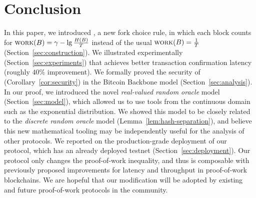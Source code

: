 \section{Conclusion}

In this paper, we introduced \poem, a new fork choice rule, in which each block
counts for $\textsc{work}(B) = \gamma - \lg \frac{H(B)}{T}$ instead of the usual $\textsc{work}(B) = \frac{1}{T}$
(Section~\ref{sec:construction}).
We illustrated experimentally (Section~\ref{sec:experiments}) that \poem achieves better transaction confirmation latency
(roughly $40\%$ improvement). We formally proved the security of \poem (Corollary~\ref{cor:security})
in the Bitcoin Backbone model
(Section~\ref{sec:analysis}).
In our proof, we introduced the novel \emph{real-valued random oracle} model (Section~\ref{sec:model}), which allowed us
to use tools from the continuous domain such as the exponential distribution. We showed this
model to be closely related to the \emph{discrete random oracle} model (Lemma~\ref{lem:hash-separation}),
and believe this new mathematical tooling may be independently useful for the analysis of other protocols.
We reported on the production-grade deployment of our protocol, which has an already deployed testnet
(Section~\ref{sec:deployment}).
Our protocol only changes the proof-of-work inequality, and thus is composable with
previously proposed improvements for latency and throughput in proof-of-work blockchains. We are hopeful
that our modification will be adopted by existing and future proof-of-work protocols in the community.